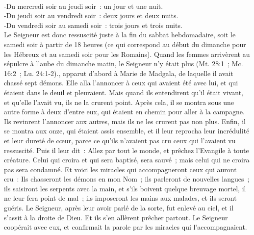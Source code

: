 \begin{multicols}{2}
{\\-Du mercredi soir au jeudi soir~: un jour et une nuit.
\\-Du jeudi soir au vendredi soir~: deux jours et deux nuits.
\\-Du vendredi soir au samedi soir~: trois jours et trois nuits. 
\\Le Seigneur est donc ressuscité juste à la fin du sabbat hebdomadaire, soit le samedi soir à partir de 18 heures (ce qui correspond au début du dimanche pour les Hébreux et au samedi soir pour les Romains). Quand les femmes arrivèrent au sépulcre à l'aube du dimanche matin, le Seigneur n'y était plus (Mt. 28:1~; Mc. 16:2~; Lu. 24:1-2).}, apparut d'abord à Marie de Madgala, de laquelle il avait chassé sept démons.
Elle alla l'annoncer à ceux qui avaient été avec lui, et qui étaient dans le deuil et pleuraient.
Mais quand ils entendirent qu'il était vivant, et qu'elle l'avait vu, ils ne la crurent point.
Après cela, il se montra sous une autre forme à deux d'entre eux, qui étaient en chemin pour aller à la campagne.
Ils revinrent l'annoncer aux autres, mais ils ne les crurent pas non plus.
Enfin, il se montra aux onze, qui étaient assis ensemble, et il leur reprocha leur incrédulité et leur dureté de cœur, parce ce qu'ils n'avaient pas cru ceux qui l'avaient vu ressuscité.
Puis il leur dit~: Allez par tout le monde, et prêchez l'Evangile à toute créature.
Celui qui croira et qui sera baptisé, sera sauvé~; mais celui qui ne croira pas sera condamné.
Et voici les miracles qui accompagneront ceux qui auront cru~: Ils chasseront les démons en mon Nom~; ils parleront de nouvelles langues~;
ils saisiront les serpents avec la main, et s'ils boivent quelque breuvage mortel, il ne leur fera point de mal~; ils imposeront les mains aux malades, et ils seront guéris.
Le Seigneur, après leur avoir parlé de la sorte, fut enlevé au ciel, et il s'assit à la droite de Dieu.
Et ils s'en allèrent prêcher partout. Le Seigneur coopérait avec eux, et confirmait la parole par les miracles qui l'accompagnaient.
\PPE{}
\end{multicols}
